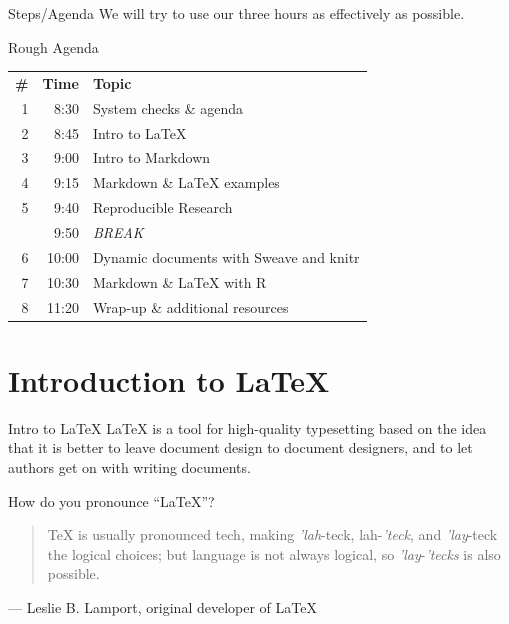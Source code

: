 \documentclass{beamer}
\begin{document}
\begin{frame}{Steps/Agenda}
\vfill
We will try to use our three hours as effectively as possible.
\begin{exampleblock}{Rough Agenda}
\begin{center}
\begin{tabular}{r|r|l}
    \textbf{\#} & \textbf{Time} & \textbf{Topic} \\
    1 & 8:30 & System checks \& agenda \\
    2 & 8:45 & Intro to LaTeX \\
    3 & 9:00 & Intro to Markdown \\
    4 & 9:15 & Markdown \& LaTeX examples \\
    5 & 9:40 & Reproducible Research \\
    \hline
     & 9:50 & \emph{BREAK} \\
    \hline
    6 & 10:00 & Dynamic documents with Sweave and knitr \\
    7 & 10:30 & Markdown \& LaTeX with R \\
    8 & 11:20 & Wrap-up \& additional resources
\end{tabular}
\end{center}
\end{exampleblock}
\end{frame}

\section{Introduction to LaTeX}
\begin{frame}{Intro to LaTeX}
\vfill
LaTeX is a tool for high-quality typesetting based on the idea that it is better to leave document design to document designers, and to let authors get on with writing documents.
\vfill
\begin{block}{How do you pronounce ``LaTeX''?}
    \begin{quote}
        TeX is usually pronounced tech, making \emph{'lah}-teck, lah-\emph{'teck}, and \emph{'lay}-teck the logical choices; but language is not always logical, so \emph{'lay}-\emph{'tecks} is also possible.
    \end{quote}
    --- Leslie B. Lamport, original developer of \LaTeX{}
\end{block}
\end{frame}
\end{document}
